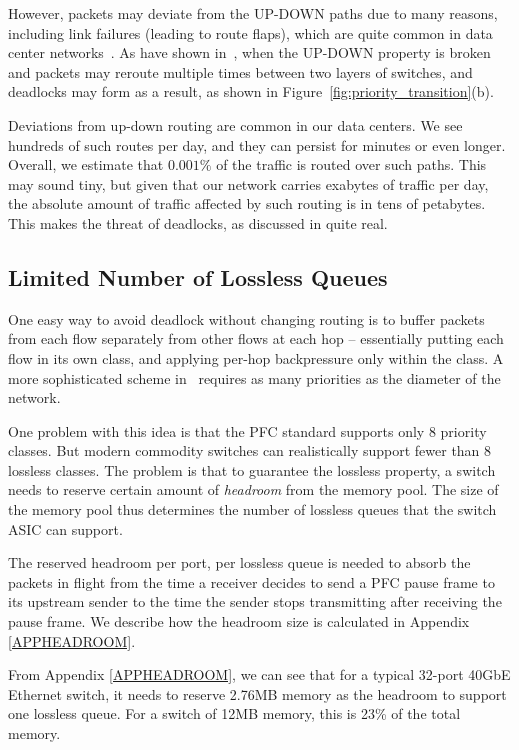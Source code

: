 However, packets may deviate from the UP-DOWN paths due to many reasons,
including link failures (leading to route flaps), which are quite common in data
center networks~\cite{netpilot,f10}.  As have shown
in~\cite{shpiner2016unlocking}, when the UP-DOWN property is broken and packets
may reroute multiple times between two layers of switches, and deadlocks may
form as a result, as shown in Figure~\ref{fig:priority_transition}(b).

Deviations from up-down routing are common in our data centers.  We
see hundreds of such routes per day, and they can persist for minutes or even
longer. Overall, we estimate that $0.001\%$ of the traffic is routed over such
paths. This may sound tiny, but given that our network carries exabytes of
traffic per day, the absolute amount of traffic affected by such routing is
in tens of petabytes. This makes the threat of deadlocks, as discussed
in\cite{rdmaatscale,shpiner2016unlocking,hu2016deadlocks} quite real.

\subsection{Limited Number of Lossless Queues}
\label{subsec:pfcheadroom}

One easy way to avoid deadlock without changing routing is to buffer packets
from each flow separately from other flows at each hop -- essentially putting
each flow in its own class, and applying per-hop backpressure only within the
class.  A more sophisticated scheme in~\cite{karol2003prevention} requires as
many priorities as the diameter of the network. 

One problem with this idea is that the PFC standard supports only 8 priority
classes. But modern commodity switches can realistically support fewer than 8
lossless classes.  The problem is that  to guarantee the lossless property, a
switch needs to reserve certain amount of {\it headroom} from the memory pool.
The size of the memory pool thus determines the number of lossless queues that
the switch ASIC can support.

The reserved headroom per port, per lossless queue is needed to absorb the
packets in flight from the time a receiver decides to send a PFC pause frame to
its upstream sender to the time the sender stops transmitting after receiving
the pause frame. We describe how the
headroom size is calculated in Appendix \ref{APPHEADROOM}.

From Appendix \ref{APPHEADROOM}, we can see that for a typical 32-port 40GbE
Ethernet switch, it needs to reserve 2.76MB memory as the headroom to support
one lossless queue. For a switch of 12MB memory, this is 23\% of the total
memory.

